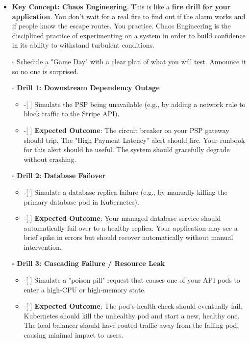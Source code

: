 \documentclass[11pt]{article}
\begin{document}
\begin{itemize}
\item \textbf{Key Concept: Chaos Engineering}. This is like a \textbf{fire drill for your application}.  You don't wait for a real fire to find out if the alarm works and if people know the escape routes. You practice. Chaos Engineering is the disciplined practice of experimenting on a system in order to build confidence in its ability to withstand turbulent conditions.
\item[{$\square$}] Schedule a "Game Day" with a clear plan of what you will test. Announce it so no one is surprised.
\item[{$\square$}] \textbf{Drill 1: Downstream Dependency Outage}
\begin{itemize}
\item -[ ] Simulate the PSP being unavailable (e.g., by adding a network rule to block traffic to the Stripe API).
\item -[ ] \textbf{Expected Outcome}: The circuit breaker on your PSP gateway should trip. The "High Payment Latency" alert should fire. Your runbook for this alert should be useful. The system should gracefully degrade without crashing.
\end{itemize}
\item[{$\square$}] \textbf{Drill 2: Database Failover}
\begin{itemize}
\item -[ ] Simulate a database replica failure (e.g., by manually killing the primary database pod in Kubernetes).
\item -[ ] \textbf{Expected Outcome}: Your managed database service should automatically fail over to a healthy replica. Your application may see a brief spike in errors but should recover automatically without manual intervention.
\end{itemize}
\item[{$\square$}] \textbf{Drill 3: Cascading Failure / Resource Leak}
\begin{itemize}
\item -[ ] Simulate a "poison pill" request that causes one of your API pods to enter a high-CPU or high-memory state.
\item -[ ] \textbf{Expected Outcome}: The pod's health check should eventually fail. Kubernetes should kill the unhealthy pod and start a new, healthy one. The load balancer should have routed traffic away from the failing pod, causing minimal impact to users.
\end{itemize}
\end{itemize}
\end{document}
